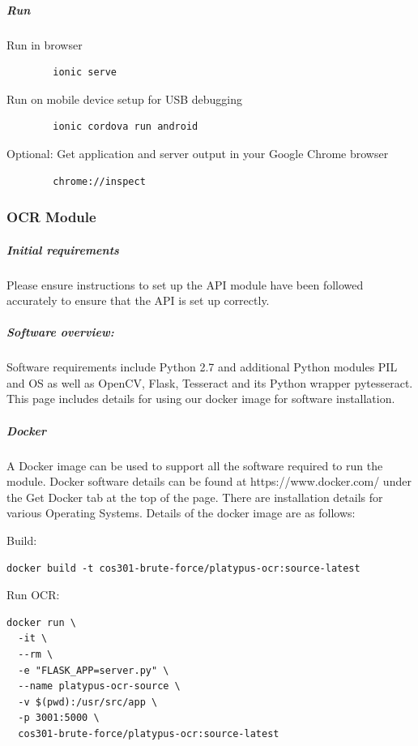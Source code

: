 \documentclass[12pt,a4paper]{article}
\begin{document}
\subparagraph{Run}
\subparagraph{}
Run in browser
\begin{lstlisting}
		ionic serve
	\end{lstlisting}
   \vspace{1cm}
Run on mobile device setup for USB debugging
\begin{lstlisting}
		ionic cordova run android
	\end{lstlisting}
   \vspace{1cm}
Optional: Get application and server output in your Google Chrome browser
	\begin{lstlisting}
		chrome://inspect
	\end{lstlisting}

    \subsubsection{OCR Module}
       \subparagraph{Initial requirements}
Please ensure instructions to set up the API module have been followed accurately to ensure that the API is set up correctly.
    \subparagraph{Software overview:}
    \subparagraph{}
    
Software requirements include Python 2.7 and additional Python modules PIL and OS as well as OpenCV, Flask, Tesseract and its Python wrapper pytesseract. This page includes details for using our docker image for software installation.

\subparagraph{Docker}
\subparagraph{}
A Docker image can be used to support all the software required to run the module. Docker software details can be found at https://www.docker.com/ under the Get Docker tab at the top of the page. There are installation details for various Operating Systems. Details of the docker image are as follows: 

Build:  
\vspace{0.5cm}
\begin{lstlisting}
docker build -t cos301-brute-force/platypus-ocr:source-latest
\end{lstlisting}
\vspace{0.5cm}

Run OCR:
\vspace{0.5cm}
\begin{lstlisting}
docker run \
  -it \
  --rm \
  -e "FLASK_APP=server.py" \
  --name platypus-ocr-source \
  -v $(pwd):/usr/src/app \
  -p 3001:5000 \
  cos301-brute-force/platypus-ocr:source-latest

\end{lstlisting}
\end{document}
